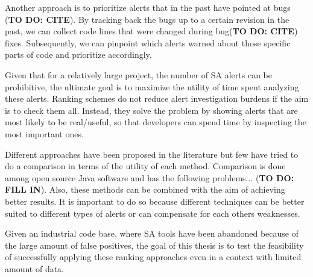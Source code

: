 \documentclass{article}
\begin{document}
Another approach is to prioritize alerts that in the past have pointed at bugs (\textbf{TO DO: CITE}). By tracking back the bugs up to a certain revision in the past, we can collect code lines that were changed during bug(\textbf{TO DO: CITE}) fixes. Subsequently, we can pinpoint which alerts warned about those specific parts of code and prioritize accordingly.

Given that for a relatively large project, the number of SA alerts can be prohibitive, the ultimate goal is to maximize the utility of time spent analyzing these alerts. Ranking schemes do not reduce alert investigation burdens if the aim is to check them all. Instead, they solve the problem by showing alerts that are most likely to be real/useful, so that developers can spend time by inspecting the most important ones.

Different approaches have been proposed in the literature but few have tried to do a comparison in terms of the utility of each method. Comparison is done among open source Java software and has the following problems... (\textbf{TO DO: FILL IN}). Also, these methods can be combined with the aim of achieving better results. It is important to do so because different techniques can be better suited to different types of alerts or can compensate for each others weaknesses.



Given an industrial code base, where SA tools have been abandoned because of the large amount of false positives, the goal of this thesis is to test the feasibility of successfully applying these ranking approaches even in a context with limited amount of data.

\end{document}
